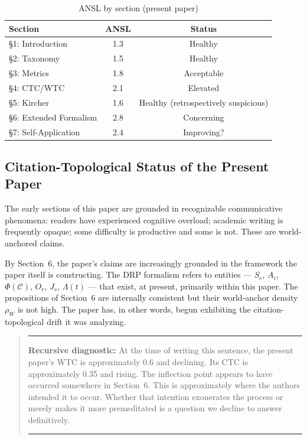 \documentclass[12pt, a4paper]{article}
\newenvironment{warnbox}
  {\begin{quote}\small\color{alarmred}\rule{\linewidth}{0.6pt}\par\smallskip}
  {\par\smallskip\rule{\linewidth}{0.4pt}\end{quote}}
\begin{document}
\begin{table}[H]
\centering
\caption{ANSL by section (present paper)}
\begin{tabular}{lcc}
\toprule
\textbf{Section} & \textbf{ANSL} & \textbf{Status} \\
\midrule
\S1: Introduction & 1.3 & Healthy \\
\S2: Taxonomy & 1.5 & Healthy \\
\S3: Metrics & 1.8 & Acceptable \\
\S4: CTC/WTC & 2.1 & Elevated \\
\S5: Kircher & 1.6 & Healthy (retrospectively suspicious) \\
\S6: Extended Formalism & 2.8 & Concerning \\
\S7: Self-Application & 2.4 & Improving? \\
\bottomrule
\end{tabular}
\end{table}

\subsection{Citation-Topological Status of the Present Paper}

The early sections of this paper are grounded in recognizable communicative phenomena: readers have experienced cognitive overload; academic writing is frequently opaque; some difficulty is productive and some is not. These are world-anchored claims.

By Section~6, the paper's claims are increasingly grounded in the framework the paper itself is constructing. The DRP formalism refers to entities --- $S_c$, $A_i$, $\Phi(\mathcal{C})$, $O_r$, $J_s$, $\Lambda(t)$ --- that exist, at present, primarily within this paper. The propositions of Section~6 are internally consistent but their world-anchor density $\rho_W$ is not high. The paper has, in other words, begun exhibiting the citation-topological drift it was analyzing.

\begin{warnbox}
\textbf{Recursive diagnostic:} At the time of writing this sentence, the present paper's WTC is approximately 0.6 and declining. Its CTC is approximately 0.35 and rising. The inflection point appears to have occurred somewhere in Section~6. This is approximately where the authors intended it to occur. Whether that intention exonerates the process or merely makes it more premeditated is a question we decline to answer definitively.
\end{warnbox}
\end{document}
